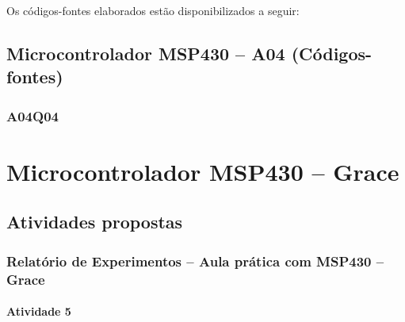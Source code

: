 \documentclass[
	12pt,				%
	openright,			%
  oneside,     %
	a4paper,			%
	english,			%
	french,				%
	spanish,			%
	brazil				%
	]{abntex2}
\begin{document}
\newpage

Os códigos-fontes elaborados estão disponibilizados a seguir:

\section*{Microcontrolador MSP430 -- A04 (Códigos-fontes)}
\label{sec:MSP430-A04Q04}
\subsection*{A04Q04}




%
%

\chapter{Microcontrolador MSP430 -- Grace} %
\label{cha:5-msp430_grace}

\section{Atividades propostas} %
\label{sec:msp430_grace-atividades_propostas}

\subsection*{Relatório de Experimentos -- Aula prática com MSP430 -- Grace}

\subsubsection*{Atividade 5}
\end{document}
